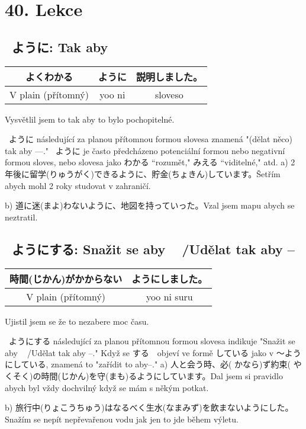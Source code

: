 \section{40. Lekce}
\label{sec:lekce_40}

\subsection{ ~ように: Tak aby ~}
\begin{center}
\begin{tabular}{|c|c|c|}
\hline
よくわかる&ように&説明しました。\\
\hline
V plain (přítomný)&yoo ni&sloveso\\
\hline
\end{tabular}
\end{center}
Vysvětlil jsem to tak aby to bylo pochopitelné.


~ように  následující za planou přítomnou formou slovesa znamená "(dělat něco) tak aby ---." ~ように je často předcházeno potenciální formou nebo negativní formou sloves, nebo slovesa jako  わかる “rozumět," みえる “viditelné," atd.
a) 2年後に留学(りゅうがく)できるように、貯金(ちょきん)しています。Šetřím abych mohl 2 roky studovat v zahraničí.

b) 道に迷(まよ)わないように、地図を持っていった。Vzal jsem mapu abych se neztratil.

\subsection{ ~ようにする: Snažit se aby ~ /Udělat tak aby -- }
\begin{center}
\begin{tabular}{|c|c|}
\hline
時間(じかん)がかからない& ようにしました。\\
\hline
V plain (přítomný) & yoo ni suru\\
\hline
\end{tabular}
\end{center}
Ujistil jsem se že to nezabere moc času.

~ようにする následující za planou přítomnou formou slovesa indikuje "Snažit se aby ~ /Udělat tak aby --." Když se する　objeví ve formě している jako v 〜ようにしている, znamená to "zařídit to aby--."
a) 人と会う時、必( かなら)ず約束( やくそく)の時間(じかん)を守(まも)るようにしています。Dal jsem si pravidlo abych byl vždy dochvilný když se mám s někým potkat.

 
b) 旅行中(りょこうちゅう)はなるべく生水(なまみず)を飲まないようにした。Snažím se nepít nepřevařenou vodu jak jen to jde během výletu.



